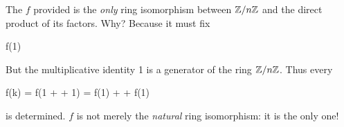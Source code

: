 \begin{remark}
  The $f$ provided is the \emph{only} ring isomorphism between $\mathbb{Z} / n\mathbb{Z}$
  and the direct product of its factors. Why? Because it must fix

  \begin{nedqn}
    f(1)
   \times \cdots {}
  \end{nedqn}

  But the multiplicative identity 1 is a generator of the ring $\mathbb{Z} / n\mathbb{Z}$.
  Thus every

  \begin{nedqn}
    f(k) = f(1 + \cdots + 1) = f(1) + \cdots + f(1)
  \end{nedqn}

  \noindent
  is determined. $f$ is not merely the \emph{natural} ring isomorphism:
  it is the only one!
\end{remark}
